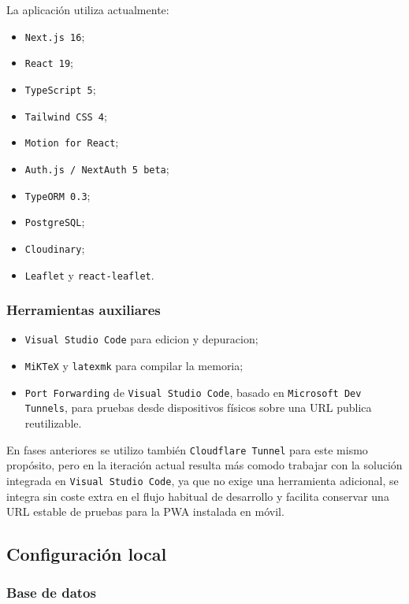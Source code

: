 La aplicación utiliza actualmente:

\begin{itemize}
    \item \texttt{Next.js 16};
    \item \texttt{React 19};
    \item \texttt{TypeScript 5};
    \item \texttt{Tailwind CSS 4};
    \item \texttt{Motion for React};
    \item \texttt{Auth.js / NextAuth 5 beta};
    \item \texttt{TypeORM 0.3};
    \item \texttt{PostgreSQL};
    \item \texttt{Cloudinary};
    \item \texttt{Leaflet} y \texttt{react-leaflet}.
\end{itemize}

\subsubsection*{Herramientas auxiliares}

\begin{itemize}
    \item \texttt{Visual Studio Code} para edicion y depuracion;
    \item \texttt{MiKTeX} y \texttt{latexmk} para compilar la memoria;
    \item \texttt{Port Forwarding} de \texttt{Visual Studio Code}, basado en \texttt{Microsoft Dev Tunnels}, para pruebas desde dispositivos físicos sobre una URL publica reutilizable.
\end{itemize}

En fases anteriores se utilizo también \texttt{Cloudflare Tunnel} para este mismo propósito, pero en la iteración actual resulta más comodo trabajar con la solución integrada en \texttt{Visual Studio Code}, ya que no exige una herramienta adicional, se integra sin coste extra en el flujo habitual de desarrollo y facilita conservar una URL estable de pruebas para la PWA instalada en móvil.

\subsection{Configuración local}

\subsubsection*{Base de datos}

